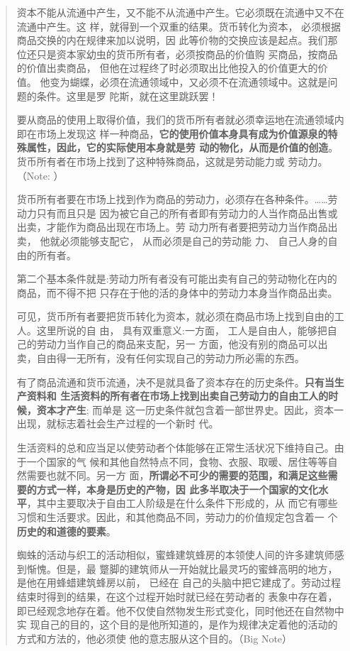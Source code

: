 \begin{quotation}
资本不能从流通中产生，又不能不从流通中产生。它必须既在流通中又不在流通中产生。这
样，就得到一个双重的结果。货币转化为资本， 必须根据商品交换的内在规律来加以说明，因
此等价物的交换应该是起点。我们那位还只是资本家幼虫的货币所有者，必须按商品的价值购
买商品，按商品的价值出卖商品， 但他在过程终了时必须取出比他投入的价值更大的价
值。 他变为蝴蝶，必须在流通领域中，又必须不在流通领域中。这就是问题的条件。这里是罗
陀斯，就在这里跳跃罢！ 

要从商品的使用上取得价值，我们的货币所有者就必须幸运地在流通领域内即在市场上发现这
样一种商品，\textbf{它的使用价值本身具有成为价值源泉的特殊属性，因此，它的实际使用本身就是劳
动的物化，从而是价值的创造}。货币所有者在市场上找到了这种特殊商品，这就是劳动能力或
劳动力。（Note: ）

\bigskip
货币所有者要在市场上找到作为商品的劳动力，必须存在各种条件。……劳动力只有而且只是
因为被它自己的所有者即有劳动力的人当作商品出售或出卖，才能作为商品出现在市场上。劳
动力所有者要把劳动力当作商品出卖， 他就必须能够支配它， 从而必须是自己的劳动能
力、 自己人身的自由的所有者。

第二个基本条件就是:劳动力所有者没有可能出卖有自己的劳动物化在内的商品，而不得不把
只存在于他的活的身体中的劳动力本身当作商品出卖。

可见，货币所有者要把货币转化为资本，就必须在商品市场上找到自由的工人。这里所说的自
由， 具有双重意义:一方面， 工人是自由人，能够把自己的劳动力当作自己的商品来支配，另一
方面，他没有别的商品可以出卖，自由得一无所有，没有任何实现自己的劳动力所必需的东西。 

\bigskip

有了商品流通和货币流通，决不是就具备了资本存在的历史条件。\textbf{只有当生产资料和
  生活资料的所有者在市场上找到出卖自己劳动力的自由工人的时候，资本才产生}; 而单是
这一历史条件就包含着一部世界史。因此，资本一出现，就标志着社会生产过程的一个新时
代。

生活资料的总和应当足以使劳动者个体能够在正常生活状况下维持自己。由于一个国家的气
候和其他自然特点不同，食物、衣服、取暖、居住等等自然需要也就不同。另一方
面，\textbf{所谓必不可少的需要的范围，和满足这些需要的方式一样，本身是历史的产物，因
  此多半取决于一个国家的文化水平}，其中主要取决于自由工人阶级是在什么条件下形成的，从
而它有哪些习惯和生活要求。因此，和其他商品不同，劳动力的价值规定包含着一
个\textbf{历史的和道德的要素}。

蜘蛛的活动与织工的活动相似，蜜蜂建筑蜂房的本领使人间的许多建筑师感到惭愧。但是，最
蹩脚的建筑师从一开始就比最灵巧的蜜蜂高明的地方， 是他在用蜂蜡建筑蜂房以前， 已经在
自己的头脑中把它建成了。劳动过程结束时得到的结果，在这个过程开始时就已经在劳动者的
表象中存在着，即已经观念地存在着。他不仅使自然物发生形式变化，同时他还在自然物中实
现自己的目的，这个目的是他所知道的，是作为规律决定着他的活动的方式和方法的，他必须使
他的意志服从这个目的。（Big Note）


\end{quotation}
